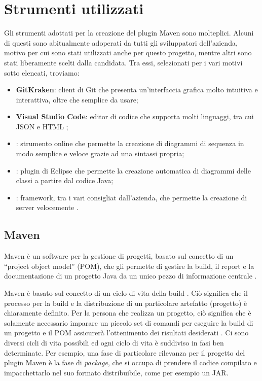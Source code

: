 \section{Strumenti utilizzati}
Gli strumenti adottati per la creazione del plugin Maven sono molteplici.
Alcuni di questi sono abitualmente adoperati da tutti gli sviluppatori dell'azienda, motivo per cui sono stati utilizzati anche per questo progetto, mentre altri sono stati liberamente scelti dalla candidata.
Tra essi, selezionati per i vari motivi sotto elencati, troviamo:
\begin{itemize}
    \item \textbf{GitKraken}: client di Git che presenta un'interfaccia grafica molto intuitiva e interattiva, oltre che semplice da usare;
    \item \textbf{Visual Studio Code}: editor di codice che supporta molti linguaggi, tra cui JSON e HTML \cite{site:visual-studio-code};
    \item {}: strumento online che permette la creazione di diagrammi di sequenza in modo semplice e veloce grazie ad una sintassi propria;
    \item {}: plugin di Eclipse che permette la creazione automatica di diagrammi delle classi a partire dal codice Java;
    \item {}: framework, tra i vari consigliat dall'azienda, che permette la creazione di server velocemente \cite{site:meecrowave}.
\end{itemize}

    \subsection{Maven} \label{mavenSection} %
        
    Maven è un software per la gestione di progetti, basato sul concetto di un ``project object model'' (POM), che gli permette di gestire la build, il report e la documentazione di un progetto Java da un unico pezzo di informazione centrale \cite{site:maven-introduzione}.

    Maven è basato sul concetto di un ciclo di vita della build .
    Ciò significa che il processo per la build e la distribuzione di un particolare artefatto (progetto) è chiaramente definito. 
    Per la persona che realizza un progetto, ciò significa che è solamente necessario imparare un piccolo set di comandi per eseguire la build di un progetto e il POM assicurerà l'ottenimento dei risultati desiderati \cite{site:maven-lifecycle}.
    Ci sono diversi cicli di vita possibili ed ogni ciclo di vita è suddiviso in fasi ben determinate.
    Per esempio, una fase di particolare rilevanza per il progetto del plugin Maven è la fase di \emph{package}, che si occupa di prendere il codice compilato e impacchettarlo nel suo formato distribuibile, come per esempio un JAR. 

